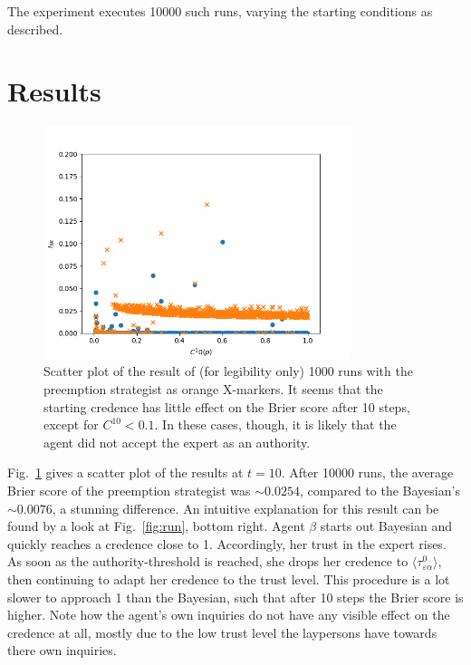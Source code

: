 \documentclass[11pt, a4paper]{scrartcl}
\renewcommand{\a}{\alpha}
\begin{document}
The experiment executes 10000 such runs, varying the starting conditions as described.

\section{Results}

\begin{figure}
	\centering
\includegraphics[width=0.8\textwidth]{Result.png}
\caption{Scatter plot of the result of (for legibility only) 1000 runs with the preemption strategist as orange X-markers. It seems that the starting credence has little effect on the Brier score after 10 steps, except for $C^{10} < 0.1$. In these cases, though, it is likely that the agent did not accept the expert as an authority.\label{fig:res}}
\end{figure}

Fig.~\ref{fig:res} gives a scatter plot of the results at $t=10$. After 10000 runs, the average Brier score of the preemption strategist was $\sim0.0254$, compared to the Bayesian's $\sim0.0076$, a stunning difference. An intuitive explanation for this result can be found by a look at Fig.~\ref{fig:run}, bottom right. Agent $\beta$ starts out Bayesian and quickly reaches a credence close to 1. Accordingly, her trust in the expert rises. As soon as the authority-threshold is reached, she drops her credence to $\langle \tau^0_{\varepsilon\a} \rangle $, then continuing to adapt her credence to the trust level. This procedure is a lot slower to approach 1 than the Bayesian, such that after 10 steps the Brier score is higher. Note how the agent's own inquiries do not have any visible effect on the credence at all, mostly due to the low trust level the laypersons have towards there own inquiries.
\end{document}
